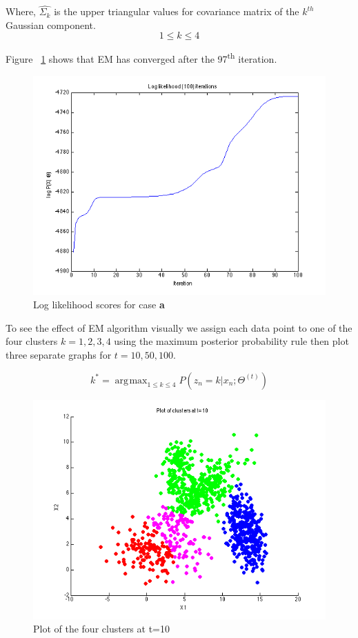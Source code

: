 \documentclass[a4paper]{article}
\DeclareMathOperator*{\argmax}{\arg\!\max}
\begin{document}
Where, $\hat{\Sigma_k}$ is the upper triangular values for covariance matrix of the $k^{th}$ Gaussian component. $$1 \le k \le 4$$

Figure ~\ref{fig:log_likelihood_a} shows that EM has converged after the 97\textsuperscript{th} iteration.

\begin{figure}[H]
  \centering
    \includegraphics[scale=.57]{images/log_likelihood_scores.png}
  \caption{Log likelihood scores for case \textbf{a}}
  \label{fig:log_likelihood_a}
\end{figure}

To see the effect of EM algorithm visually we assign each data point to one of the four clusters $k = 1,2,3,4$ using the maximum posterior probability rule then plot three separate graphs for $t = 10,50,100$.

$$ k^* = \argmax_{1 \le k \le 4} P(z_n=k|x_n;\Theta^{(t)}) $$

\begin{figure}[H]
  \centering
    \includegraphics[scale=.57]{images/clusters_t_10.png}
  \caption{Plot of the four clusters at t=10}
\end{figure}
\end{document}
